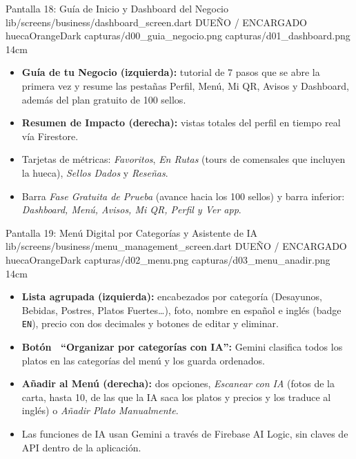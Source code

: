 \pantalladoble
  {Pantalla 18: Guía de Inicio y Dashboard del Negocio}
  {lib/screens/business/dashboard_screen.dart}
  {DUEÑO / ENCARGADO}
  {huecaOrangeDark}
  {capturas/d00_guia_negocio.png}
  {capturas/d01_dashboard.png}
  {14cm}
  {
    \begin{itemize}[leftmargin=*, itemsep=2pt]
      \item \textbf{Guía de tu Negocio (izquierda):} tutorial de 7 pasos que se abre la primera vez y resume las pestañas Perfil, Menú, Mi QR, Avisos y Dashboard, además del plan gratuito de 100 sellos.
      \item \textbf{Resumen de Impacto (derecha):} vistas totales del perfil en tiempo real vía Firestore.
      \item Tarjetas de métricas: \textit{Favoritos}, \textit{En Rutas} (tours de comensales que incluyen la hueca), \textit{Sellos Dados} y \textit{Reseñas}.
      \item Barra \textit{Fase Gratuita de Prueba} (avance hacia los 100 sellos) y barra inferior: \textit{Dashboard, Menú, Avisos, Mi QR, Perfil y Ver app}.
    \end{itemize}
  }

\pantalladoble
  {Pantalla 19: Menú Digital por Categorías y Asistente de IA}
  {lib/screens/business/menu_management_screen.dart}
  {DUEÑO / ENCARGADO}
  {huecaOrangeDark}
  {capturas/d02_menu.png}
  {capturas/d03_menu_anadir.png}
  {14cm}
  {
    \begin{itemize}[leftmargin=*, itemsep=2pt]
      \item \textbf{Lista agrupada (izquierda):} encabezados por categoría (Desayunos, Bebidas, Postres, Platos Fuertes\dots), foto, nombre en español e inglés (badge \texttt{EN}), precio con dos decimales y botones de editar y eliminar.
      \item \textbf{Botón \ ``Organizar por categorías con IA'':} Gemini clasifica todos los platos en las categorías del menú y los guarda ordenados.
      \item \textbf{Añadir al Menú (derecha):} dos opciones, \textit{Escanear con IA} (fotos de la carta, hasta 10, de las que la IA saca los platos y precios y los traduce al inglés) o \textit{Añadir Plato Manualmente}.
      \item Las funciones de IA usan Gemini a través de Firebase AI Logic, sin claves de API dentro de la aplicación.
    \end{itemize}
  }

